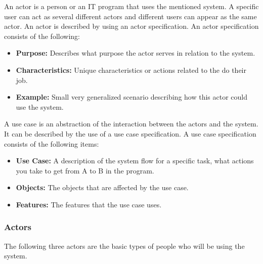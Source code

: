 An actor is a person or an IT program that uses the mentioned system. A specific user can act as several different actors and different users can appear as the same actor. An actor is described by using an actor specification. An actor specification consists of the following:

\begin{itemize}
    \item \textbf{Purpose:} Describes what purpose the actor serves in relation to the system.
    \item \textbf{Characteristics:} Unique characteristics or actions related to the do their job.
    \item \textbf{Example:} Small very generalized scenario describing how this actor could use the system.
\end{itemize}

A use case is an abstraction of the interaction between the actors and the system. It can be described by the use of a use case specification. A use case specification consists of the following items:
\begin{itemize}
    \item \textbf{Use Case:} A description of the system flow for a specific task, what actions you take to get from A to B in the program.
    \item \textbf{Objects:} The objects that are affected by the use case. 
    \item \textbf{Features:} The features that the use case uses. 
\end{itemize}


\subsubsection{Actors}

The following three actors are the basic types of people who will be using the system. \\


